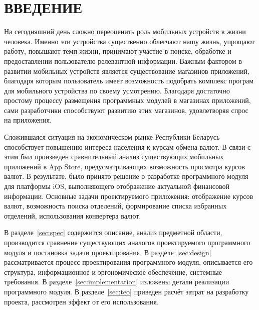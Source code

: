 \section*{ВВЕДЕНИЕ}

На сегодняшний день сложно переоценить роль мобильных устройств в жизни человека.
Именно эти устройства существенно облегчают нашу жизнь, упрощают работу,
повышают темп жизни, принимают участие в поиске, обработке и предоставлении
пользователю релевантной информации.
Важным фактором в развитии мобильных устройств является
существование магазинов приложений, благодаря которым пользователь имеет
возможность подобрать комплекс програм для мобильного устройства по своему усмотрению.
Благодаря достаточно простому процессу размещения программных модулей в магазинах
приложений, сами разработчики способствуют развитию этих магазинов, удовлетворяя
спрос на приложения.

Сложившаяся ситуация на экономическом рынке Республики Беларусь
способствует повышению интереса населения к курсам обмена валют.
В связи с этим был произведен сравнительный анализ существующих мобильных
приложений в App Store, предусматривающих возможность просмотра курсов валют.
В результате, было принято решение о разработке программного
модуля для платформы iOS, выполняющего отображение актуальной финансовой
информации. Основные задачи проектируемого приложения: отображение курсов валют,
возможность поиска отделений, формирование списка избранных отделений,
использования конвертера валют.

В разделе~\ref{sec:spec} содержится описание, анализ предметной области,
производится сравнение существующих аналогов проектируемого программного модуля
и постановка задачи проектирования.
В разделе~\ref{sec:design} рассматривается процесс проектирования программного модуля,
описывается его структура, информационное и эргономическое обеспечение,
системные требования.
В разделе~\ref{sec:implementation} изложены детали реализации программного модуля.
В разделе~\ref{sec:teo} приведен расчёт затрат на разработку проекта,
рассмотрен эффект от его использования.
